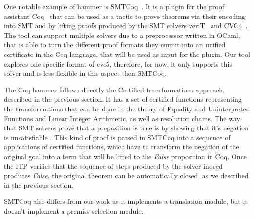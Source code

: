 One notable example of hammer is SMTCoq~\cite{smtcoq}.
It is a plugin for the proof assistant Coq~\cite{Bertot2004} that
can be used as a tactic to prove theorems via their encoding into
SMT and by lifting proofs produced by the SMT solvers veriT~\cite{Bouton2009}
and CVC4~\cite{Barrett2011}. The tool can support multiple solvers
due to a preprocessor written in OCaml, that is able to turn the different
proof formats they emmit into an unified certificate in the Coq language,
that will be used as input for the plugin. Our tool explores one specific
format of cvc5, therefore, for now, it only supports this solver and is
less flexible in this aspect then SMTCoq.

The Coq hammer follows directly the Certified transformations approach, described in
the previous section. It has a set of certified functions representing the transformations
that can be done in the theory of Equality and Uninterpreted Functions and
Linear Integer Arithmetic, as well as resolution chains. The way that SMT solvers prove
that a proposition is true is by showing that it's negation is unsatisfiable
. This kind of proof
is parsed in SMTCoq into a sequence of applications of certified functions, which have
to transform the negation of the original goal into a
term that will be lifted to the \textit{False} proposition in Coq. Once the
ITP verifies that the sequence of steps produced by the solver indeed
produces \textit{False}, the original theorem can be automatically closed,
as we described in the previous section.

SMTCoq also differs from our work as it implements a translation module, but
it doesn't implement a premiss selection module.
